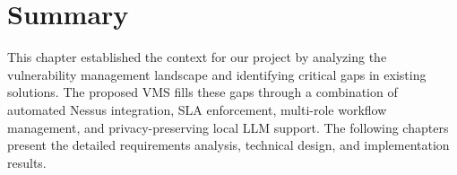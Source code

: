 \section{Summary}

This chapter established the context for our project by analyzing the vulnerability management landscape and identifying critical gaps in existing solutions. The proposed VMS fills these gaps through a combination of automated Nessus integration, SLA enforcement, multi-role workflow management, and privacy-preserving local LLM support. The following chapters present the detailed requirements analysis, technical design, and implementation results.
